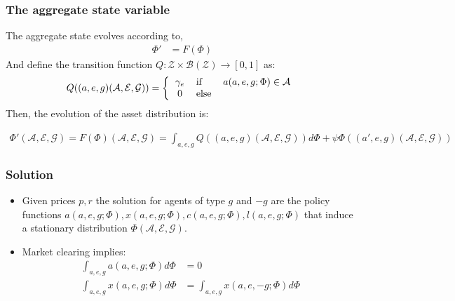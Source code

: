 \documentclass{beamer}
\begin{document}
\begin{frame}
\frametitle{The aggregate state variable }
The aggregate state evolves according to,
\begin{align*}
\Phi' & = F(\Phi) 
\end{align*}
And define the transition function $Q:\mathcal{Z}\times\mathcal{B(Z)}\to[0,1]$ as: 
\begin{align*}
Q((a,e,g)(\mathcal{A},\mathcal{E},\mathcal{G})) = \left\{
\begin{tabular}{clc}
$\gamma_{e}$ & if      & $a(a,e,g;\Phi) \in \mathcal{A} $\\
0 & else & 
\end{tabular}
\right.
\end{align*}
Then, the evolution of the asset distribution is:
\begin{footnotesize}
\begin{align*}
\Phi'(\mathcal{A},\mathcal{E},\mathcal{G}) = F(\Phi) (\mathcal{A},\mathcal{E},\mathcal{G})= \int_{a,e,g} Q((a,e,g)(\mathcal{A},\mathcal{E},\mathcal{G})) d \Phi+\psi\Phi((a',e,g)(\mathcal{A},\mathcal{E},\mathcal{G}))
\end{align*}
\end{footnotesize}

\end{frame}

\begin{frame}
\frametitle{Solution}
\begin{itemize}
\item Given prices $p,r$ the solution for agents of type $g$ and $-g$  are the policy functions $a(a,e,g;\Phi), x(a,e,g;\Phi), c(a,e,g;\Phi), l(a,e,g;\Phi)$ that induce a stationary distribution $\Phi(\mathcal{A,E,G})$.
\item Market clearing implies:
\begin{align*}
\int_{a,e,g} a(a,e,g;\Phi) d\Phi &= 0 \\
\int_{a,e,g} x (a,e,g;\Phi) d \Phi &= \int_{a,e,g} x(a,e,-g;\Phi) d\Phi
\end{align*}
\end{itemize}



\end{frame}
\end{document}

